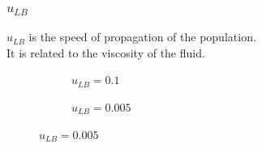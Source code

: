 \documentclass{beamer}
\begin{document}
\begin{frame}[fragile]
\frametitle{$u_{LB}$}
$u_{LB}$ is the speed of propagation of the population. \\ 
It is related to the viscosity of the fluid.\\
\begin{figure}
\begin{subfigure}{0.48\textwidth}
\caption{$u_{LB}=0.1$}
\end{subfigure}
\begin{subfigure}{0.48\textwidth}
\caption{$u_{LB}=0.005$}
\end{subfigure}
\end{figure}
\end{frame}
\end{document}
